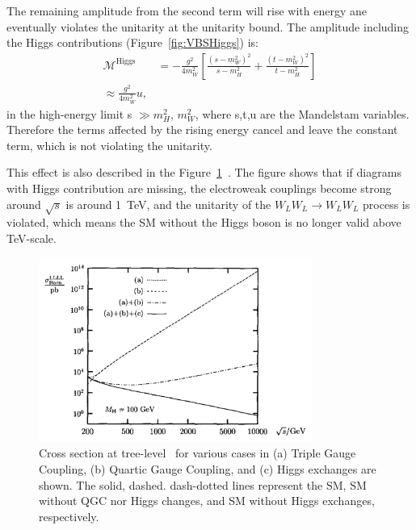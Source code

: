 The remaining amplitude from the second term will rise with energy ane eventually violates the unitarity at the unitarity bound. 
The amplitude including the Higgs contributions (Figure~\ref{fig:VBSHiggs}) is:
\begin{equation}
\begin{aligned}
\mathcal{M}^{\text {Higgs}} 
&=-\frac{g^{2}}{4 m_{W}^{2}}\left[\frac{\left(s-m_{W}^{2}\right)^{2}}{s-m_{H}^{2}}+\frac{\left(t-m_{W}^{2}\right)^{2}}{t-m_{H}^{2}}\right] \\
\approx \frac{g^{2}}{4 m_{W}^{2}} u,
\end{aligned}
\end{equation}
in the high-energy limit s $ \gg m_{H}^{2}$, $m_{W}^{2}$, where s,t,u are the Mandelstam variables.
Therefore the terms affected by the rising energy cancel and leave the constant term, which is not violating the unitarity.

This effect is also described in the Figure~\ref{fig:violation}~\cite{DENNER199827}.
The figure shows that if diagrams with Higgs contribution are missing, the electroweak couplings become strong around $\sqrt{s}$ is around 1~TeV, and the unitarity of the $W_LW_L \rightarrow W_LW_L$ process is violated, which means the SM without the Higgs boson is no longer valid above TeV-scale. 

\begin{figure}[tbp]
\begin{center}
 \includegraphics[width=0.80\textwidth,keepaspectratio]{figures/violation}
\caption{
Cross section at tree-level~\cite{DENNER199827} for various cases in (a) Triple Gauge Coupling, (b) Quartic Gauge Coupling, and (c) Higgs exchanges are shown. The solid, dashed. dash-dotted lines represent the SM, SM without QGC nor Higgs changes, and SM without Higgs exchanges, respectively.
}
\label{fig:violation}
\end{center}
\end{figure}


